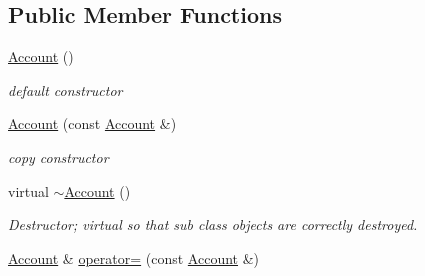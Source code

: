 \subsection*{Public Member Functions}
\begin{CompactItemize}
\item 
\hyperlink{classAccount_366660970b5eeb5c17436062327f1b14}{Account} ()
\begin{CompactList}\small\item\em default constructor \item\end{CompactList}\item 
\hyperlink{classAccount_a7427622a35446ddc6380ef8bcc7b98a}{Account} (const \hyperlink{classAccount}{Account} \&)
\begin{CompactList}\small\item\em copy constructor \item\end{CompactList}\item 
virtual \hyperlink{classAccount_569c9ef0e42b9157690b4ceb646daba8}{$\sim$Account} ()
\begin{CompactList}\small\item\em Destructor; virtual so that sub class objects are correctly destroyed. \item\end{CompactList}\item 
\hypertarget{classAccount_d9a32924b5b7e46bfe63e66ab2aed0cb}{
\hyperlink{classAccount}{Account} \& \hyperlink{classAccount_d9a32924b5b7e46bfe63e66ab2aed0cb}{operator=} (const \hyperlink{classAccount}{Account} \&)}
\label{classAccount_d9a32924b5b7e46bfe63e66ab2aed0cb}


\end{CompactItemize}
